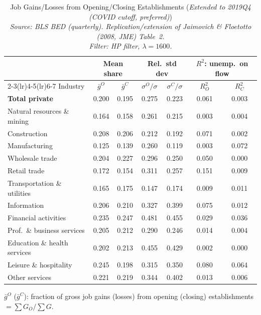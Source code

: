 \begin{table}[htbp]
\centering
\small
\caption{Job Gains/Losses from Opening/Closing Establishments (\emph{Extended to 2019Q4 (COVID cutoff, preferred)}) \\
  \emph{Source: BLS BED (quarterly). Replication/extension of Jaimovich \& Floetotto (2008, JME) Table~2.} \\  \emph{Filter: HP filter, $\lambda=1600$.}}
\label{tab:jf_t2_ext_2019_hp}
\begin{tabular}{lcccccc}
\toprule
 & \multicolumn{2}{c}{Mean share} & \multicolumn{2}{c}{Rel.\ std dev} & \multicolumn{2}{c}{$R^2$: unemp.\ on flow} \\
\cmidrule(lr){2-3}\cmidrule(lr){4-5}\cmidrule(lr){6-7}
Industry & $\bar{g}^O$ & $\bar{g}^C$ & $\sigma^O/\sigma$ & $\sigma^C/\sigma$ & $R^2_O$ & $R^2_C$ \\
\midrule
\midrule
\textbf{Total private} & 0.200 & 0.195 & 0.275 & 0.223 & 0.061 & 0.003 \\
Natural resources \& mining & 0.164 & 0.158 & 0.261 & 0.215 & 0.003 & 0.004 \\
Construction & 0.208 & 0.206 & 0.212 & 0.192 & 0.071 & 0.002 \\
Manufacturing & 0.125 & 0.139 & 0.260 & 0.119 & 0.003 & 0.072 \\
Wholesale trade & 0.204 & 0.227 & 0.296 & 0.250 & 0.050 & 0.000 \\
Retail trade & 0.172 & 0.154 & 0.311 & 0.257 & 0.151 & 0.009 \\
Transportation \& utilities & 0.165 & 0.175 & 0.147 & 0.174 & 0.009 & 0.011 \\
Information & 0.206 & 0.210 & 0.327 & 0.399 & 0.075 & 0.012 \\
Financial activities & 0.235 & 0.247 & 0.481 & 0.455 & 0.029 & 0.036 \\
Prof.~\& business services & 0.205 & 0.212 & 0.290 & 0.246 & 0.014 & 0.004 \\
Education \& health services & 0.202 & 0.213 & 0.455 & 0.429 & 0.002 & 0.000 \\
Leisure \& hospitality & 0.245 & 0.198 & 0.315 & 0.350 & 0.080 & 0.064 \\
Other services & 0.221 & 0.219 & 0.344 & 0.402 & 0.013 & 0.006 \\
\bottomrule
\end{tabular}
\begin{tablenotes}[flushleft]\footnotesize
\item $\bar{g}^O$ ($\bar{g}^C$): fraction of gross job gains (losses) from opening (closing) establishments $= \sum G_O / \sum G$.

\end{tablenotes}
\end{table}

